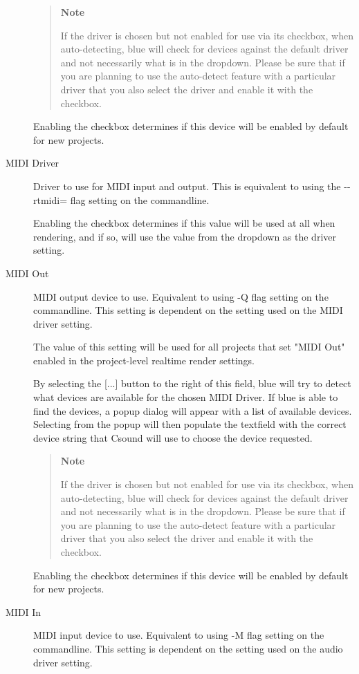 \begin{description}
\begin{quote}
\textbf{Note}

If the driver is chosen but not enabled for use via its checkbox, when
auto-detecting, blue will check for devices against the default driver
and not necessarily what is in the dropdown. Please be sure that if you
are planning to use the auto-detect feature with a particular driver
that you also select the driver and enable it with the checkbox.
\end{quote}

Enabling the checkbox determines if this device will be enabled by
default for new projects.
\item[MIDI Driver]
Driver to use for MIDI input and output. This is equivalent to using the
-\/-rtmidi= flag setting on the commandline.

Enabling the checkbox determines if this value will be used at all when
rendering, and if so, will use the value from the dropdown as the driver
setting.
\item[MIDI Out]
MIDI output device to use. Equivalent to using -Q flag setting on the
commandline. This setting is dependent on the setting used on the MIDI
driver setting.

The value of this setting will be used for all projects that set "MIDI
Out" enabled in the project-level realtime render settings.

By selecting the {[}...{]} button to the right of this field, blue will
try to detect what devices are available for the chosen MIDI Driver. If
blue is able to find the devices, a popup dialog will appear with a list
of available devices. Selecting from the popup will then populate the
textfield with the correct device string that Csound will use to choose
the device requested.

\begin{quote}
\textbf{Note}

If the driver is chosen but not enabled for use via its checkbox, when
auto-detecting, blue will check for devices against the default driver
and not necessarily what is in the dropdown. Please be sure that if you
are planning to use the auto-detect feature with a particular driver
that you also select the driver and enable it with the checkbox.
\end{quote}

Enabling the checkbox determines if this device will be enabled by
default for new projects.
\item[MIDI In]
MIDI input device to use. Equivalent to using -M flag setting on the
commandline. This setting is dependent on the setting used on the audio
driver setting.


\end{description}
